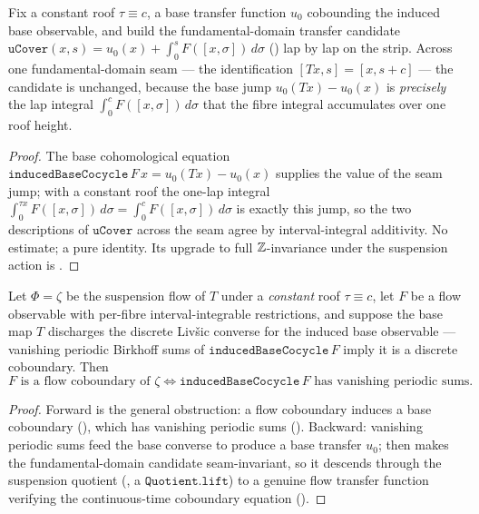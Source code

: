\begin{lemma}\label{uCover_gen}
  \leanok
  Fix a constant roof \(\tau\equiv c\), a base transfer function \(u_0\) cobounding the induced base
  observable, and build the fundamental-domain transfer candidate
  \(\texttt{uCover}(x,s) = u_0(x) + \int_0^{s} F([x,\sigma])\,d\sigma\)
  () lap by lap on the strip. Across one fundamental-domain seam --- the
  identification \([T x, s] = [x, s + c]\) --- the candidate is unchanged, because the base jump
  \(u_0(T x) - u_0(x)\) is \emph{precisely} the lap integral \(\int_0^{c} F([x,\sigma])\,d\sigma\)
  that the fibre integral accumulates over one roof height.
\end{lemma}
\begin{proof}\leanok
  The base cohomological equation \(\texttt{inducedBaseCocycle}\,F\,x = u_0(T x) - u_0(x)\) supplies
  the value of the seam jump; with a constant roof the one-lap integral \(\int_0^{\tau x}F([x,\sigma])
  \,d\sigma = \int_0^{c}F([x,\sigma])\,d\sigma\) is exactly this jump, so the two descriptions of
  \(\texttt{uCover}\) across the seam agree by interval-integral additivity. No estimate; a pure
  identity. Its upgrade to full \(\mathbb{Z}\)-invariance under the suspension action is
  .
\end{proof}

\begin{theorem}\label{livsic_suspensionFlow_constRoof}
  \leanok
  Let \(\Phi = \zeta\) be the suspension flow of \(T\) under a \emph{constant} roof \(\tau\equiv c\),
  let \(F\) be a flow observable with per-fibre interval-integrable restrictions, and suppose the base
  map \(T\) discharges the discrete Livšic converse for the induced base observable --- vanishing
  periodic Birkhoff sums of \(\texttt{inducedBaseCocycle}\,F\) imply it is a discrete coboundary.
  Then
  \[
    F \text{ is a flow coboundary of } \zeta
      \iff \texttt{inducedBaseCocycle}\,F \text{ has vanishing periodic sums.}
  \]
\end{theorem}
\begin{proof}\leanok
  Forward is the general obstruction: a flow coboundary induces a base coboundary
  (), which has vanishing periodic sums ().
  Backward: vanishing periodic sums feed the base converse to produce a base transfer \(u_0\);
   then makes the fundamental-domain candidate seam-invariant, so it descends
  through the suspension quotient (, a \(\texttt{Quotient.lift}\))
  to a genuine flow transfer function verifying the continuous-time coboundary equation
  ().
\end{proof}

